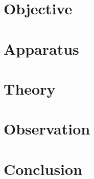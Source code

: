 \documentclass[a4paper]{article}
\begin{document}
 \newpage
{\hypersetup{linkcolor=black} %
\tableofcontents\thispagestyle{empty}}
\newpage
{}
\section{Objective}

\section{Apparatus}

\section{Theory}

\section{Observation}

\section{Conclusion}

\end{document}

